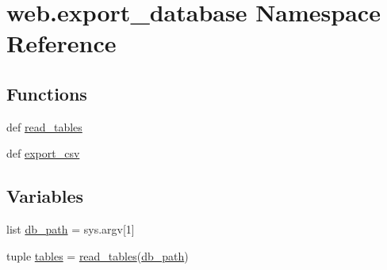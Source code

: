 \hypertarget{namespaceweb_1_1export__database}{\section{web.\-export\-\_\-database Namespace Reference}
\label{namespaceweb_1_1export__database}
}
\subsection*{Functions}
\begin{DoxyCompactItemize}
\item 
def \hyperlink{namespaceweb_1_1export__database_a50152cf2426ffb14e5ea14acd778fa78}{read\-\_\-tables}
\item 
def \hyperlink{namespaceweb_1_1export__database_aaac04dfbbbf4a5463adcfacffaeaf632}{export\-\_\-csv}
\end{DoxyCompactItemize}
\subsection*{Variables}
\begin{DoxyCompactItemize}
\item 
list \hyperlink{namespaceweb_1_1export__database_a42269ae99aba6b0b88e905698a468eba}{db\-\_\-path} = sys.\-argv\mbox{[}1\mbox{]}
\item 
tuple \hyperlink{namespaceweb_1_1export__database_a8dcaae1aee086bde0bfe50ab1f4e0885}{tables} = \hyperlink{namespaceweb_1_1export__database_a50152cf2426ffb14e5ea14acd778fa78}{read\-\_\-tables}(\hyperlink{namespaceweb_1_1export__database_a42269ae99aba6b0b88e905698a468eba}{db\-\_\-path})
\end{DoxyCompactItemize}


